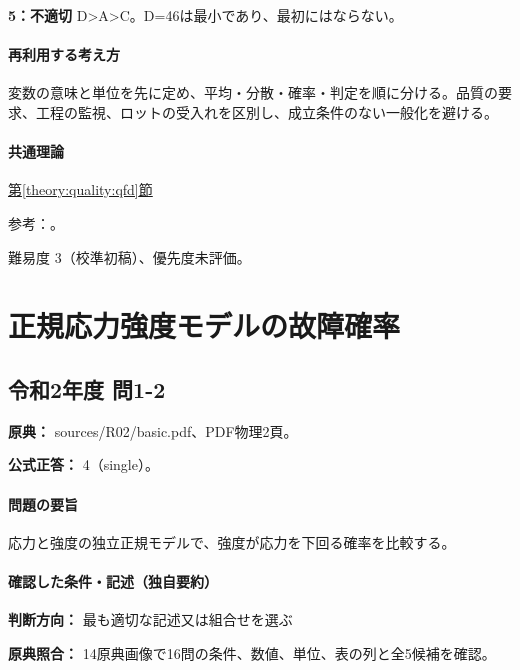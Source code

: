 \noindent\textbf{5：不適切} D>A>C。D=\allowbreak{}46は最小であり、最初にはならない。\par

\paragraph{再利用する考え方} 変数の意味と単位を先に定め、平均・分散・確率・判定を順に分ける。品質の要求、工程の監視、ロットの受入れを区別し、成立条件のない一般化を避ける。

\paragraph{共通理論} \hyperref[theory:quality:qfd]{第\ref*{theory:quality:qfd}節}

\par 参考：\cite{quality_qfd_scale}。

\par 難易度 3（校準初稿）、優先度未評価。

\section{正規応力強度モデルの故障確率}

\subsection{令和2年度 問1-2}
\label{q:r02-reg-basic-1-2}

\noindent\textbf{原典：} sources/R02/basic.pdf、PDF物理2頁。

\textbf{公式正答：} 4（single）。

\paragraph{問題の要旨} 応力と強度の独立正規モデルで、強度が応力を下回る確率を比較する。

\paragraph{確認した条件・記述（独自要約）}\mbox{}\par

\noindent\textbf{判断方向：} 最も適切な記述又は組合せを選ぶ\par

\noindent\textbf{原典照合：} 14原典画像で16問の条件、数値、単位、表の列と全5候補を確認。\par

